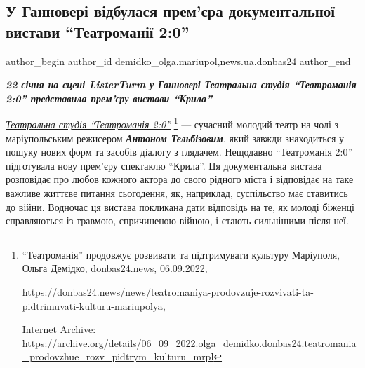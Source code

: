  
 
 
 
 
 
\subsection{У Ганновері відбулася прем'єра документальної вистави \enquote{Театроманії 2:0}}
\label{sec:27_01_2023.stz.news.ua.donbas24.1.gannover_premjera_teatromania_20}
 
\ifcmt
 author_begin
   author_id demidko_olga.mariupol,news.ua.donbas24
 author_end
\fi


\begin{center}
  \em\color{blue}\bfseries\Large
22 січня на сцені ListerTurm у Ганновері Театральна
студія \enquote{Театроманія 2:0} представила прем'єру вистави \enquote{Крила}
\end{center}

\href{https://archive.org/details/06_09_2022.olga_demidko.donbas24.teatromania_prodovzhue_rozv_pidtrym_kulturu_mrpl}{\emph{Театральна студія \enquote{Театроманія 2:0}}}%
\footnote{\enquote{Театроманія} продовжує розвивати та підтримувати культуру Маріуполя, Ольга Демідко, donbas24.news, 06.09.2022, %
\par\url{https://donbas24.news/news/teatromaniya-prodovzuje-rozvivati-ta-pidtrimuvati-kulturu-mariupolya}, \par%
Internet Archive: \url{https://archive.org/details/06_09_2022.olga_demidko.donbas24.teatromania_prodovzhue_rozv_pidtrym_kulturu_mrpl}%
} — сучасний молодий театр на чолі з
маріупольським режисером \emph{\textbf{Антоном Тельбізовим}}, який завжди знаходиться у пошуку
нових форм та засобів діалогу з глядачем. Нещодавно \enquote{Театроманія 2:0}
підготувала нову прем'єру спектаклю \enquote{Крила}. Ця документальна вистава
розповідає про любов кожного актора до свого рідного міста і відповідає на таке
важливе життєве питання сьогодення, як, наприклад, суспільство має ставитись до
війни. Водночас ця вистава покликана дати відповідь на те, як молоді біженці
справляються із травмою, спричиненою війною, і стають сильнішими після неї.

